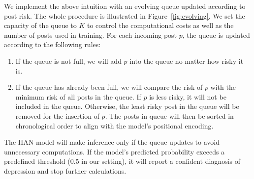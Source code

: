 We implement the above intuition with an evolving queue updated according to 
post risk. The whole procedure is illustrated in Figure~\ref{fig:evolving}. 
We set the capacity of the queue to $K$ to control the computational costs 
as well as the number of posts used in training. 
For each incoming post $p$, the queue is updated according to the 
following rules: 
\begin{enumerate}
    \item If the queue is not full, we will add $p$ into the queue no matter how risky it is.
    \item If the queue has already been full, we will compare the risk of $p$ with the minimum risk of all posts in the queue. If $p$ is less risky, it will not be included in the queue. Otherwise, the least risky post in the queue will be removed for the insertion of $p$. The posts in queue will then be sorted in chronological order to align with the model's positional encoding.
\end{enumerate}

The HAN model will make inference only if the queue updates to avoid unnecessary computations. If the model's predicted probability exceeds a predefined threshold (0.5 in our setting), it will report a confident diagnosis of depression and stop further calculations.
